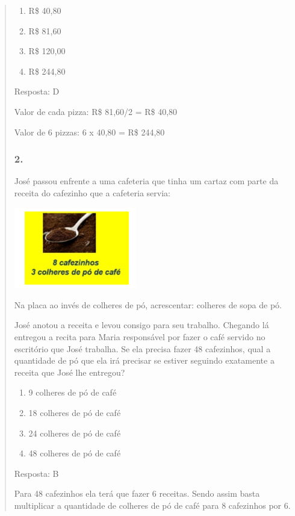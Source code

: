 \begin{enumerate}
\begin{escolha}
\begin{enumerate}
\begin{itemize}
\begin{itemize}
\begin{escolha}
\begin{quote}
\begin{escolha}
{\begin{enumerate}
\def\labelenumi{\alph{enumi})}
\item
  R\$ 40,80
\item
  R\$ 81,60
\item
  R\$ 120,00
\item
  R\$ 244,80
\end{enumerate}

Resposta: D

Valor de cada pizza: R\$ 81,60/2 = R\$ 40,80

Valor de 6 pizzas: 6 x 40,80 = R\$ 244,80

\subsubsection{2.}\label{section-128}

José passou enfrente a uma cafeteria que tinha um cartaz com parte da
receita do cafezinho que a cafeteria servia:

\includegraphics[width=2.10018in,height=1.39179in]{media/image133.png}

Na placa ao invés de colheres de pó, acrescentar: colheres de sopa de
pó.

José anotou a receita e levou consigo para seu trabalho. Chegando lá
entregou a recita para Maria responsável por fazer o café servido no
escritório que José trabalha. Se ela precisa fazer 48 cafezinhos, qual a
quantidade de pó que ela irá precisar se estiver seguindo exatamente a
receita que José lhe entregou?

\begin{enumerate}
\def\labelenumi{\alph{enumi})}
\item
  9 colheres de pó de café
\item
  18 colheres de pó de café
\item
  24 colheres de pó de café
\item
  48 colheres de pó de café
\end{enumerate}

Resposta: B

Para 48 cafezinhos ela terá que fazer 6 receitas. Sendo assim basta
multiplicar a quantidade de colheres de pó de café para 8 cafezinhos por
6.

}
\end{escolha}
\end{quote}
\end{escolha}
\end{itemize}
\end{itemize}
\end{enumerate}
\end{escolha}
\end{enumerate}
